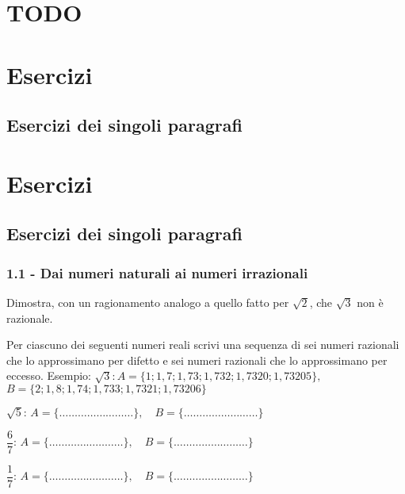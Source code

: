 
\section{TODO}

\section{Esercizi}

\subsection{Esercizi dei singoli paragrafi}

\subsubsection*{}

\section{Esercizi}
\subsection{Esercizi dei singoli paragrafi}
\subsubsection*{1.1 - Dai numeri naturali ai numeri irrazionali}

\begin{esercizio}
\label{ese:1.1}
Dimostra, con un ragionamento analogo a quello fatto per $\sqrt 2$, che $\sqrt 3$ non è razionale.
\end{esercizio}

\begin{esercizio}
\label{ese:1.2}
 Per ciascuno dei seguenti numeri reali scrivi una sequenza di sei numeri razionali che lo approssimano per difetto e sei numeri razionali che lo approssimano per eccesso. Esempio:
$\sqrt 3$:\,$A=\{1; 1,7; 1,73; 1,732; 1,7320; 1,73205\},$\,$B=\{2; 1,8; 1,74; 1,733; 1,7321; 1,73206\}$
\begin{enumeratea}
 \item$\sqrt{5}:\, A=\{\ldots\ldots\ldots\ldots\ldots\ldots\ldots\ldots\},\quad 
B=\{\ldots\ldots\ldots\ldots\ldots\ldots\ldots\ldots\}$
 \item$\dfrac{6}{7}:\, 
A=\{\ldots\ldots\ldots\ldots\ldots\ldots\ldots\ldots\},\quad 
B=\{\ldots\ldots\ldots\ldots\ldots\ldots\ldots\ldots\}$
 \item$\dfrac{1}{7}:\, 
A=\{\ldots\ldots\ldots\ldots\ldots\ldots\ldots\ldots\},\quad 
B=\{\ldots\ldots\ldots\ldots\ldots\ldots\ldots\ldots\}$
\end{enumeratea}
\end{esercizio}

